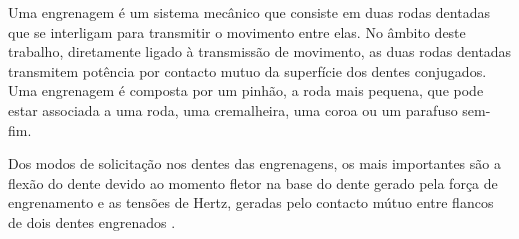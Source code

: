 \newpage
\par
Uma engrenagem é um sistema mecânico que consiste em duas rodas dentadas que se interligam para transmitir o movimento entre elas. No âmbito deste trabalho, diretamente ligado à transmissão de movimento, as duas rodas dentadas transmitem potência por contacto mutuo da superfície dos dentes conjugados. Uma engrenagem é composta por um pinhão, a roda mais pequena, que pode estar associada a uma roda, uma cremalheira, uma coroa ou um parafuso sem-fim.
\par
Dos modos de solicitação nos dentes das engrenagens, os mais importantes são a flexão do dente devido ao momento fletor na base do dente gerado pela força de engrenamento e as tensões de Hertz, geradas pelo contacto mútuo entre flancos de dois dentes engrenados \cite{Completo2019}.
